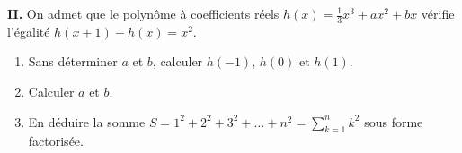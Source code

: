 \documentclass[12pt,a4paper]{article}
\begin{document}
\textbf{II.} On admet que le polynôme à coefficients réels \( h(x) = \frac{1}{3}x^3 + ax^2 + bx \) vérifie l’égalité \( h(x+1) - h(x) = x^2 \).

\begin{enumerate}
    \item Sans déterminer \( a \) et \( b \), calculer \( h(-1) \), \( h(0) \) et \( h(1) \).
    \item Calculer \( a \) et \( b \).
    \item En déduire la somme \( S = 1^2 + 2^2 + 3^2 + \dots + n^2 = \sum_{k=1}^n k^2 \) sous forme factorisée.
\end{enumerate}
\end{document}
